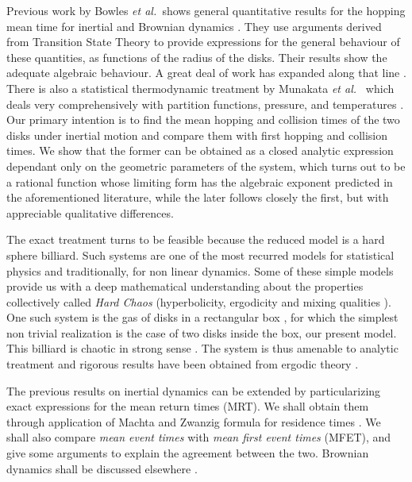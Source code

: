 \documentclass[letterpaper,10pt, jcp, aps]{revtex4-1}
\newcommand{\etal}{\emph{et al.\ }}
\begin{document}
Previous work
by Bowles \etal shows general quantitative results for the hopping 
mean time for inertial and Brownian dynamics \cite{Bowles04}. 
They use arguments derived from Transition State Theory 
to provide expressions for the
general behaviour of these quantities, as functions of the
radius of the disks. Their results show the adequate algebraic behaviour.
A great deal of work has expanded along that line  \cite{Suh05, Ball09}.
There is also a statistical thermodynamic treatment by Munakata \etal 
which deals very comprehensively with partition functions, pressure,
and temperatures \cite{Munakata02, Munakata06}. 
Our  primary intention is
to find  the mean hopping and collision times of the two disks under 
inertial motion and compare them with first hopping and collision times.
We show that the former can 
be obtained  as a closed analytic expression dependant only
on the geometric parameters of the system, which turns 
out to be a rational function whose limiting form
has the algebraic exponent predicted in the aforementioned literature, while
the later follows closely the first, but with appreciable
qualitative differences. 

The exact treatment  turns to be  feasible because  
the reduced model is a hard sphere billiard. 
Such systems  are one of the most recurred models for
statistical physics and  traditionally, for non linear dynamics.  
Some of these simple models
 provide us with a deep mathematical understanding
about  the properties collectively called  \emph{Hard Chaos} 
(hyperbolicity, ergodicity and mixing qualities \cite{Sinai70, Gallavotti74}). 
One such system is the
gas of disks in a rectangular box \cite{SzaszBook00}, 
for which the simplest non trivial
realization is the case of  two disks inside the box, our
present model.
This billiard is chaotic in
strong sense \cite{Sim99}. The system  is thus amenable
to analytic treatment
and rigorous results have been obtained from ergodic theory \cite{MarkChern}.

The previous  results on
inertial dynamics can be extended  by particularizing 
exact expressions for the mean return times (MRT). 
We shall  obtain them through application of 
Machta and Zwanzig formula for residence times \cite{MachtaZwan}. 
We shall also  compare \emph{mean event times} with 
\emph{mean first event times} (MFET),
and give some arguments to explain the agreement between the two. 
Brownian dynamics shall be discussed elsewhere \cite{WorkInProgress}.
\end{document}
